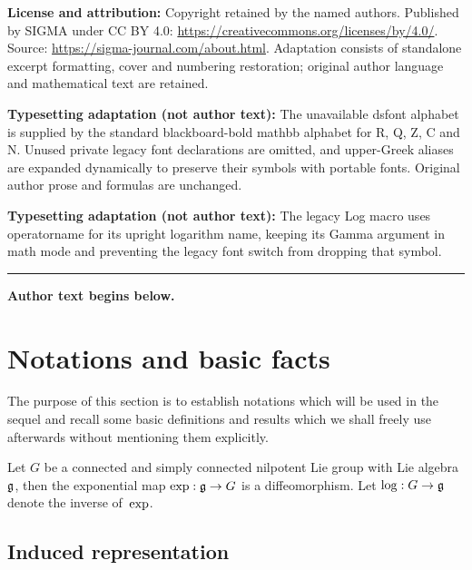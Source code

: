\documentclass[11pt]{article}
\begin{document}
\noindent\textbf{License and attribution:} Copyright retained by the named authors. Published by SIGMA under CC BY 4.0: \url{https://creativecommons.org/licenses/by/4.0/}. Source: \url{https://sigma-journal.com/about.html}. Adaptation consists of standalone excerpt formatting, cover and numbering restoration; original author language and mathematical text are retained.\par
\noindent\textbf{Typesetting adaptation (not author text):} The unavailable dsfont alphabet is supplied by the standard blackboard-bold mathbb alphabet for R, Q, Z, C and N. Unused private legacy font declarations are omitted, and upper-Greek aliases are expanded dynamically to preserve their symbols with portable fonts. Original author prose and formulas are unchanged.\par
\noindent\textbf{Typesetting adaptation (not author text):} The legacy Log macro uses operatorname for its upright logarithm name, keeping its Gamma argument in math mode and preventing the legacy font switch from dropping that symbol.\par
\medskip\hrule\medskip\noindent\textbf{Author text begins below.}\par
\setcounter{section}{1}
\setcounter{subsection}{0}
\setcounter{subsubsection}{0}
\setcounter{equation}{1}
\section{Notations and basic facts} \label{section2}

The purpose of this section is to establish notations which will be
used in the sequel and recall some basic def\/initions and results
which we shall freely use afterwards without mentioning them
explicitly.

 Let $G$  be a connected and simply
connected nilpotent Lie group with Lie algebra $\frak g$, then the
exponential map ${\rm exp}: \frak g \rightarrow G$ is a
dif\/feomorphism. Let $\log: G \rightarrow \frak g$
denote the inverse of~${\rm exp}$.

\subsection{Induced representation}\label{section2.1} %
\end{document}
